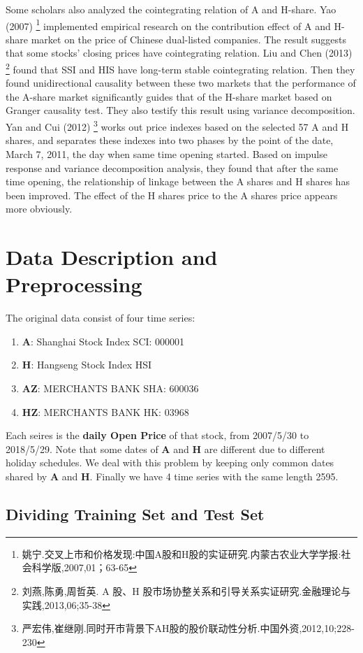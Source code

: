 \documentclass[aps,pre,12pt,preprint,onecolumn,showpacs,showkeys]{revtex4-1}
\begin{document}
Some scholars also analyzed the cointegrating relation of A and H-share. Yao (2007) 
\footnote{姚宁.交叉上市和价格发现:中国A股和H股的实证研究.内蒙古农业大学学报:社会科学版,2007,01；63-65}
implemented empirical research on the contribution effect of A and H-share market on the price of Chinese dual-listed companies. The result suggests that some stocks’ closing prices have cointegrating relation. Liu and Chen (2013) 
\footnote{刘燕,陈勇,周哲英. A 股、H 股市场协整关系和引导关系实证研究.金融理论与实践,2013,06;35-38}
found that SSI and HIS have long-term stable cointegrating relation. Then they found unidirectional causality between these two markets that the performance of the A-share market significantly guides that of the H-share market based on Granger causality test. They also testify this result using variance decomposition. Yan and Cui (2012) 
\footnote{严宏伟,崔继刚.同时开市背景下AH股的股价联动性分析.中国外资,2012,10;228-230}
works out price indexes based on the selected 57 A and H shares, and separates these indexes into two phases by the point of the date, March 7, 2011, the day when same time opening started. Based on impulse response and variance decomposition analysis, they found that after the same time opening, the relationship of linkage between the A shares and H shares has been improved. The effect of the H shares price to the A shares price appears more obviously.


\section{Data Description and Preprocessing}
The original data consist of four time series:
\begin{enumerate}
    \item \textbf{A}: Shanghai Stock Index SCI: 000001
    \item \textbf{H}: Hangseng Stock Index HSI
    \item \textbf{AZ}: MERCHANTS BANK SHA: 600036
    \item \textbf{HZ}: MERCHANTS BANK HK: 03968
\end{enumerate}

Each seires is the \textbf{daily Open Price} of that stock, from 2007/5/30 to 2018/5/29. Note that some dates of \textbf{A} and \textbf{H} are different due to different holiday schedules. We deal with this problem by keeping only common dates shared by \textbf{A} and \textbf{H}. Finally we have 4 time series with the same length 2595.

    \subsection{Dividing Training Set and Test Set}
\end{document}
